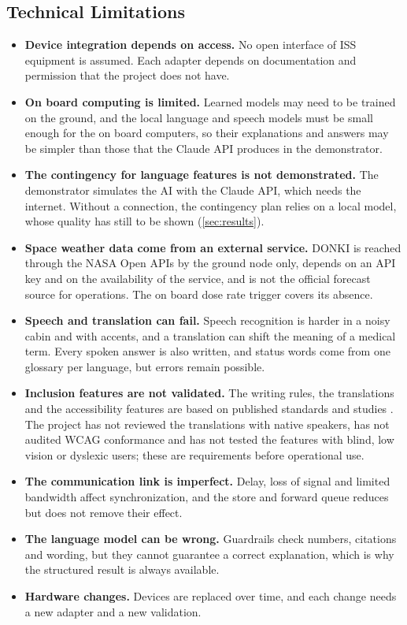 \subsection{Technical Limitations}
\label{subsec:technical-limitations}

\begin{itemize}
\item \textbf{Device integration depends on access.} No open interface of ISS equipment is assumed. Each adapter depends on documentation and permission that the project does not have.
\item \textbf{On board computing is limited.} Learned models may need to be trained on the ground, and the local language and speech models must be small enough for the on board computers, so their explanations and answers may be simpler than those that the Claude API produces in the demonstrator.
\item \textbf{The contingency for language features is not demonstrated.} The demonstrator simulates the AI with the Claude API, which needs the internet. Without a connection, the contingency plan relies on a local model, whose quality has still to be shown (\ref{sec:results}).
\item \textbf{Space weather data come from an external service.} DONKI is reached through the NASA Open APIs by the ground node only, depends on an API key and on the availability of the service, and is not the official forecast source for operations. The on board dose rate trigger covers its absence.
\item \textbf{Speech and translation can fail.} Speech recognition is harder in a noisy cabin and with accents, and a translation can shift the meaning of a medical term. Every spoken answer is also written, and status words come from one glossary per language, but errors remain possible.
\item \textbf{Inclusion features are not validated.} The writing rules, the translations and the accessibility features are based on published standards and studies \cite{w3c_wcag21,plain_language_guide,budescu2009uncertainty}. The project has not reviewed the translations with native speakers, has not audited WCAG conformance and has not tested the features with blind, low vision or dyslexic users; these are requirements before operational use.
\item \textbf{The communication link is imperfect.} Delay, loss of signal and limited bandwidth affect synchronization, and the store and forward queue reduces but does not remove their effect.
\item \textbf{The language model can be wrong.} Guardrails check numbers, citations and wording, but they cannot guarantee a correct explanation, which is why the structured result is always available.
\item \textbf{Hardware changes.} Devices are replaced over time, and each change needs a new adapter and a new validation.
\end{itemize}

